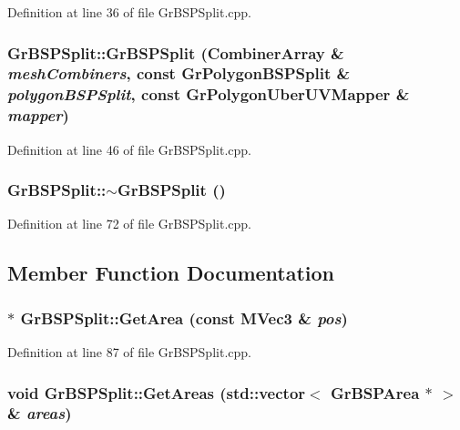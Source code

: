 Definition at line 36 of file GrBSPSplit.cpp.\hypertarget{class_gr_b_s_p_split_dfb634909406abfbadc2a5af029d7e1f}{
\subsubsection[{GrBSPSplit}]{\setlength{\rightskip}{0pt plus 5cm}GrBSPSplit::GrBSPSplit ({\bf CombinerArray} \& {\em meshCombiners}, \/  const {\bf GrPolygonBSPSplit} \& {\em polygonBSPSplit}, \/  const {\bf GrPolygonUberUVMapper} \& {\em mapper})}}
\label{class_gr_b_s_p_split_dfb634909406abfbadc2a5af029d7e1f}




Definition at line 46 of file GrBSPSplit.cpp.\hypertarget{class_gr_b_s_p_split_9bafe80ce7b2b9f769c3cfa81cb6ae74}{
\subsubsection[{$\sim$GrBSPSplit}]{\setlength{\rightskip}{0pt plus 5cm}GrBSPSplit::$\sim$GrBSPSplit ()}}
\label{class_gr_b_s_p_split_9bafe80ce7b2b9f769c3cfa81cb6ae74}




Definition at line 72 of file GrBSPSplit.cpp.

\subsection{Member Function Documentation}
\hypertarget{class_gr_b_s_p_split_3340c0f7673b0861c89f8b434b97271c}{
\subsubsection[{GetArea}]{ $\ast$ GrBSPSplit::GetArea (const {\bf MVec3} \& {\em pos})}}
\label{class_gr_b_s_p_split_3340c0f7673b0861c89f8b434b97271c}




Definition at line 87 of file GrBSPSplit.cpp.\hypertarget{class_gr_b_s_p_split_6bbc3680f991d069a2e7da4d1d5ae939}{
\subsubsection[{GetAreas}]{\setlength{\rightskip}{0pt plus 5cm}void GrBSPSplit::GetAreas (std::vector$<$ {\bf GrBSPArea} $\ast$ $>$ \& {\em areas})}}
\label{class_gr_b_s_p_split_6bbc3680f991d069a2e7da4d1d5ae939}




